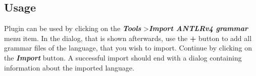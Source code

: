 \subsection{Usage}

Plugin can be used by clicking on the \textbf{\textit{Tools}} \textgreater \textbf{\textit{Import ANTLRv4 grammar}} menu item.
In the dialog, that is shown afterwards, use the \textbf{+} button to add all grammar files of the language, that you wish to import.
Continue by clicking on the \textbf{\textit{Import}} button.
A successful import should end with a dialog containing information about the imported language.

